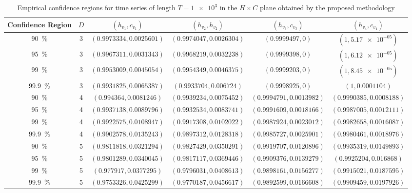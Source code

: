 \begin{table}
    \caption{Empirical confidence regions for time series of length $T = \num[scientific-notation=true]{1 e3}$ in the $H \times C$ plane obtained by the proposed methodology}
    \label{Tab:Regions1000}
    \centering
    \begin{tabular}{cccccc}
    \toprule
Confidence Region & $D$ & $(h_{v_1}, c_{v_1})$ & $(h_{v_2}, h_{v_2})$ & $(h_{v_3}, c_{v_3})$ & $(h_{v_4},c_{v_4})$\\ 
\midrule
\SI{90}{\percent} & 3 & $(0.9973334, 0.0025601)$ & $(0.9974047, 0.0026304)$ & $(0.9999497, 0)$ & $(1, \num[scientific-notation=true]{5.17e-05})$\\
\SI{95}{\percent} & 3 & $(0.9967311, 0.0031343)$ & $(0.9968219, 0.0032238)$ & $(0.9999398, 0)$ & $(1, \num[scientific-notation=true]{6.12e-05})$\\
\SI{99}{\percent} & 3 & $(0.9953009, 0.0045054)$ & $(0.9954349, 0.0046375)$ & $(0.9999203, 0)$ & $(1, \num[scientific-notation=true]{8.45e-05})$\\
\SI{99.9}{\percent} & 3 & $(0.9931825, 0.0065387)$ & $(0.9933704, 0.006724)$ & $(0.9998925, 0)$ & $(1, 0.0001104)$\\
\cmidrule(lr){1-6}
\SI{90}{\percent} & 4 & $(0.994364, 0.0081246)$ & $(0.9939234, 0.0075452)$ & $(0.9994791, 0.0013982)$ & $(0.9990385, 0.0008188)$\\
\SI{95}{\percent} & 4 & $(0.9937138, 0.0089796)$ & $(0.9932534, 0.0083741)$ & $(0.9991609, 0.0018166)$ & $(0.9987005, 0.0012111)$\\
\SI{99}{\percent} & 4 & $(0.9922575, 0.0108947)$ & $(0.9917308, 0.0102022)$ & $(0.9987924, 0.0023012)$ & $(0.9982658, 0.0016087)$\\
\SI{99.9}{\percent} & 4 & $(0.9902578, 0.0135243)$ & $(0.9897312, 0.0128318)$ & $(0.9985727, 0.0025901)$ & $(0.9980461, 0.0018976)$\\
\cmidrule(lr){1-6}
\SI{90}{\percent} & 5 & $(0.9811818, 0.0321294)$ & $(0.9827429, 0.0350291)$ & $(0.9919707, 0.0120896)$ & $(0.9935319, 0.0149893)$\\
\SI{95}{\percent} & 5 & $(0.9801289, 0.0340045)$ & $(0.9817117, 0.0369446)$ & $(0.9909376, 0.0139279)$ & $(0.9925204, 0.016868)$\\
\SI{99}{\percent} & 5 & $(0.977917, 0.0377295)$ & $(0.9796031, 0.0408613)$ & $(0.9898161, 0.0156277)$ & $(0.9915021, 0.0187595)$\\
\SI{99.9}{\percent} & 5 & $(0.9753326, 0.0425299)$ & $(0.9770187, 0.0456617)$ & $(0.9892599, 0.0166608)$ & $(0.9909459, 0.0197926)$\\

\end{tabular}
\end{table}
